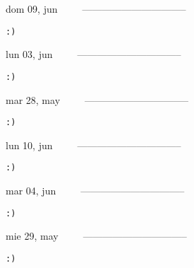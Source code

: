 \documentclass[letterpaper,10pt]{article}
\begin{document}
\begin{multicols}{3}
{dom 09, jun\ \ \ \ \ --------------------------------}
\begin{flushright}\begin{small}\texttt{:)}\end{small}\end{flushright}
\vfill
{lun 03, jun\ \ \ \ \ --------------------------------}
\begin{flushright}\begin{small}\texttt{:)}\end{small}\end{flushright}\par
\vfill
{mar 28, may\ \ \ \ \ --------------------------------}
\begin{flushright}\begin{small}\texttt{:)}\end{small}\end{flushright}\par
\vfill
\end{multicols}
\vspace{1.05cm}

\begin{multicols}{3}
{lun 10, jun\ \ \ \ \ --------------------------------}
\begin{flushright}\begin{small}\texttt{:)}\end{small}\end{flushright}
\vfill
{mar 04, jun\ \ \ \ \ --------------------------------}
\begin{flushright}\begin{small}\texttt{:)}\end{small}\end{flushright}\par
\vfill
{mie 29, may\ \ \ \ \ --------------------------------}
\begin{flushright}\begin{small}\texttt{:)}\end{small}\end{flushright}\par
\vfill
\end{multicols}
\vspace{1.05cm}
\end{document}
